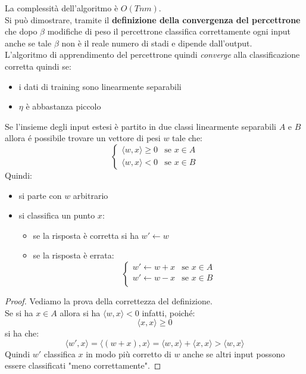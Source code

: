 La complessità dell'algoritmo è $O(Tnm)$.\\
Si può dimostrare, tramite il \textbf{definizione della convergenza del percettrone}
che dopo $\beta$ modifiche di peso il percettrone classifica 
correttamente ogni input anche se tale $\beta$ non è il reale numero di stadi e
dipende dall'output.\\
L'algoritmo di apprendimento del percettrone quindi \textit{converge} alla
classificazione corretta quindi se:
\begin{itemize}
	\item i dati di training sono linearmente separabili
	\item $\eta$ è abbastanza piccolo
\end{itemize}
\begin{definizione}
	Se l'insieme degli input estesi è partito in due classi linearmente separabili
	$A$ e $B$ allora é possibile trovare un vettore di pesi $w$ tale che:
	\[
		\begin{cases}
			\langle w, x\rangle\geq 0 & \mbox{se }x\in A \\
			\langle w, x\rangle < 0   & \mbox{se }x\in B 
		\end{cases}
	\]
	Quindi:
	\begin{itemize}
		\item si parte con $w$ arbitrario
		\item si classifica un punto $x$:
		      \begin{itemize}
		      	\item se la risposta è corretta si ha $w'\gets w$
		      	\item se la risposta è errata:
		      	      \[
		      	      	\begin{cases}
		      	      		w'\gets w+x & \mbox{se }x\in A \\
		      	      		w'\gets w-x & \mbox{se }x\in B \\
		      	      	\end{cases}
		      	      \]
		      \end{itemize}
	\end{itemize}
	
\end{definizione}
\begin{proof}
	Vediamo la prova della correttezza del definizione.\\
	Se si ha $x\in A$ allora si ha $\langle w, x\rangle<0$ infatti, poiché:
	\[\langle x, x\rangle\geq 0\]
	si ha che:
	\[\langle w', x\rangle=\langle (w+x), x\rangle=\langle w, x\rangle+\langle x,
		x\rangle>\langle w, x\rangle\]
		Quindi $w'$ classifica $x$ in modo più corretto di $w$ anche se altri input
		possono essere classificati "meno correttamente".
		\end{proof}
